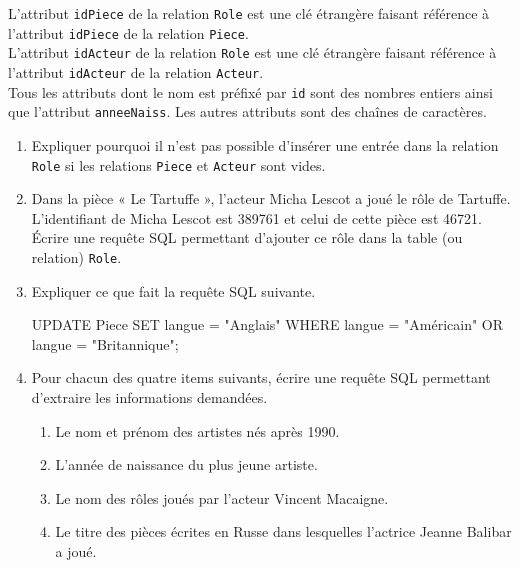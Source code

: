 \documentclass[a4paper,12pt,french]{book}
\begin{document}
    L’attribut \texttt{idPiece} de la relation \texttt{Role} est une clé étrangère faisant référence à l’attribut
    \texttt{idPiece} de la relation \texttt{Piece}.\\
    L’attribut \texttt{idActeur} de la relation \texttt{Role} est une clé étrangère faisant référence à l’attribut
    \texttt{idActeur} de la relation \texttt{Acteur}.\\
    Tous les attributs dont le nom est préfixé par \texttt{id} sont des nombres entiers ainsi que l'attribut
    \texttt{anneeNaiss}. Les autres attributs sont des chaînes de caractères.

    \begin{enumerate}[\bfseries 1.]
        \item 	Expliquer pourquoi il n'est pas possible d'insérer une entrée dans la relation \texttt{Role} si les
        relations \texttt{Piece} et \texttt{Acteur} sont vides.
        \item	Dans la pièce « Le Tartuffe », l'acteur Micha Lescot a joué le rôle de Tartuffe.\\
        L’identifiant de Micha Lescot est 389761 et celui de cette pièce est 46721.\\
        Écrire une requête SQL permettant d’ajouter ce rôle dans la table (ou relation) \texttt{Role}.
        \item Expliquer ce que fait la requête SQL suivante.
        \begin{sql}
UPDATE Piece
SET langue = "Anglais"
WHERE langue = "Américain" OR langue = "Britannique";
        \end{sql}
        \item Pour chacun des quatre items suivants, écrire une requête SQL permettant d’extraire les
        informations demandées.
        \begin{enumerate}[\bfseries a.]
            \item 	Le nom et prénom des artistes nés après 1990.
            \item 	L’année de naissance du plus jeune artiste.
            \item 	Le nom des rôles joués par l'acteur Vincent Macaigne.
            \item 	Le titre des pièces écrites en Russe dans lesquelles l’actrice Jeanne Balibar a joué.
        \end{enumerate}
    \end{enumerate}
\end{document}
